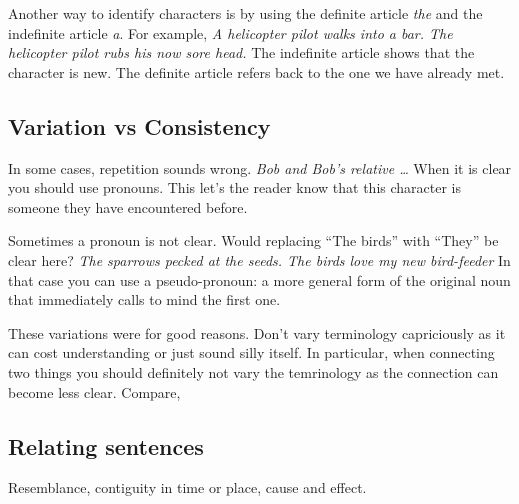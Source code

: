 \documentclass{article}
\newcommand{\example}[1]{\textit{#1}}
\begin{document}
Another way to identify characters is by using the definite article \textit{the}\/ and the indefinite article \textit{a}\/. For example,
\example{A helicopter pilot walks into a bar. The helicopter pilot rubs his now sore head.}
The indefinite article shows that the character is new. The definite article refers back to the one we have already met.

\subsection{Variation vs Consistency}

In some cases, repetition sounds wrong.
\example{Bob and Bob's relative \ldots}
When it is clear you should use pronouns. This let's the reader know that this character is someone they have encountered before.

Sometimes a pronoun is not clear. Would replacing ``The birds'' with ``They'' be clear here?
\example{The sparrows pecked at the seeds. The birds love my new bird-feeder}
In that case you can use a pseudo-pronoun: a more general form of the original noun that immediately calls to mind the first one.

These variations were for good reasons. Don't vary terminology capriciously as it can cost understanding or just sound silly itself. In particular, when connecting two things you should definitely not vary the temrinology as the connection can become less clear. Compare,


\subsection{Relating sentences}

Resemblance, contiguity in time or place, cause and effect.


\end{document}
